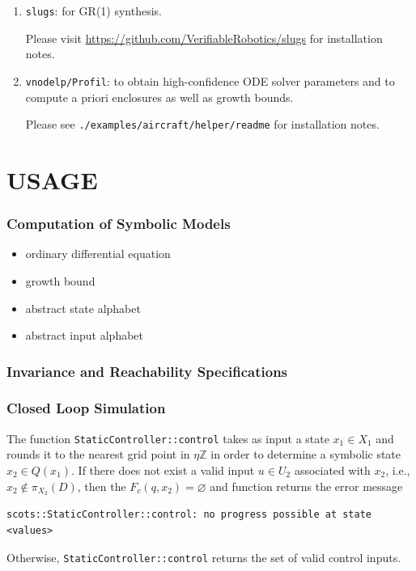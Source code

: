 \documentclass[a4paper]{amsart}
\newcommand{\Z}{\mathbb{Z}}
\renewcommand{\emptyset}{{\varnothing}}
\begin{document}
\begin{enumerate}
  \item {\tt slugs}: for GR(1) synthesis. 
  
  Please visit \url{https://github.com/VerifiableRobotics/slugs} for
  installation notes.

  \item {\tt vnodelp/Profil}: to obtain high-confidence ODE solver parameters
  and to compute a priori enclosures as well as growth bounds.

  Please see {\tt ./examples/aircraft/helper/readme} for 
  installation notes.


\end{enumerate}




	

\newpage


\part{USAGE}

\section{Computation of Symbolic Models}
\label{s:usage:abs}

\begin{itemize}
  \item ordinary differential equation 
  \item growth bound
  \item abstract state alphabet 
  \item abstract input alphabet 
\end{itemize}


\section{Invariance and Reachability Specifications}

\section{Closed Loop Simulation}
\label{s:usage:simulation}
The
function {\tt StaticController::control} takes as input a state $x_1\in X_1$ and
rounds it to the nearest grid point in $\eta\Z$ in order to determine a
symbolic state $x_2\in Q(x_1)$. If there does not exist a valid input $u\in U_2$
associated with $x_2$, i.e., $x_2\not\in \pi_{X_2}(D)$, then the
$F_c(q,x_2)=\emptyset$ and function returns the error message
\begin{lstlisting}[basicstyle=\small\ttfamily]
scots::StaticController::control: no progress possible at state <values> 
\end{lstlisting}
Otherwise, {\tt StaticController::control} returns the set of valid control
inputs.
\end{document}

